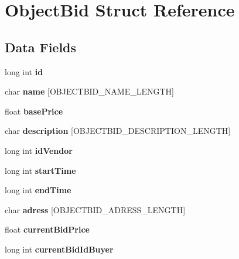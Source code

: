\hypertarget{struct_object_bid}{\section{Object\-Bid Struct Reference}
\label{struct_object_bid}
}
\subsection*{Data Fields}
\begin{DoxyCompactItemize}
\item 
\hypertarget{struct_object_bid_a53f4656a3ccbae3d40e94f582eef745f}{long int {\bfseries id}}\label{struct_object_bid_a53f4656a3ccbae3d40e94f582eef745f}

\item 
\hypertarget{struct_object_bid_a8b0efa1f52a6b46d640cfcf93172083e}{char {\bfseries name} \mbox{[}O\-B\-J\-E\-C\-T\-B\-I\-D\-\_\-\-N\-A\-M\-E\-\_\-\-L\-E\-N\-G\-T\-H\mbox{]}}\label{struct_object_bid_a8b0efa1f52a6b46d640cfcf93172083e}

\item 
\hypertarget{struct_object_bid_ad7e7bdb2bbc09612e2b037a0df5d76dd}{float {\bfseries base\-Price}}\label{struct_object_bid_ad7e7bdb2bbc09612e2b037a0df5d76dd}

\item 
\hypertarget{struct_object_bid_a203af9554762f924c14e5c30b24352a1}{char {\bfseries description} \mbox{[}O\-B\-J\-E\-C\-T\-B\-I\-D\-\_\-\-D\-E\-S\-C\-R\-I\-P\-T\-I\-O\-N\-\_\-\-L\-E\-N\-G\-T\-H\mbox{]}}\label{struct_object_bid_a203af9554762f924c14e5c30b24352a1}

\item 
\hypertarget{struct_object_bid_a56c855fe82a6ab9e09389c23a73eeec0}{long int {\bfseries id\-Vendor}}\label{struct_object_bid_a56c855fe82a6ab9e09389c23a73eeec0}

\item 
\hypertarget{struct_object_bid_a39256f6302441e1a26db958909e7431d}{long int {\bfseries start\-Time}}\label{struct_object_bid_a39256f6302441e1a26db958909e7431d}

\item 
\hypertarget{struct_object_bid_a03ea3a2cebde4b5cae63c7105339c294}{long int {\bfseries end\-Time}}\label{struct_object_bid_a03ea3a2cebde4b5cae63c7105339c294}

\item 
\hypertarget{struct_object_bid_a05eb87542785d73c5aa5cbe4e3a6d262}{char {\bfseries adress} \mbox{[}O\-B\-J\-E\-C\-T\-B\-I\-D\-\_\-\-A\-D\-R\-E\-S\-S\-\_\-\-L\-E\-N\-G\-T\-H\mbox{]}}\label{struct_object_bid_a05eb87542785d73c5aa5cbe4e3a6d262}

\item 
\hypertarget{struct_object_bid_a8864df4945a55f29bb320025d6011cc1}{float {\bfseries current\-Bid\-Price}}\label{struct_object_bid_a8864df4945a55f29bb320025d6011cc1}

\item 
\hypertarget{struct_object_bid_aa79adfae7ada9530c98f5510fc34a0f7}{long int {\bfseries current\-Bid\-Id\-Buyer}}\label{struct_object_bid_aa79adfae7ada9530c98f5510fc34a0f7}

\end{DoxyCompactItemize}


